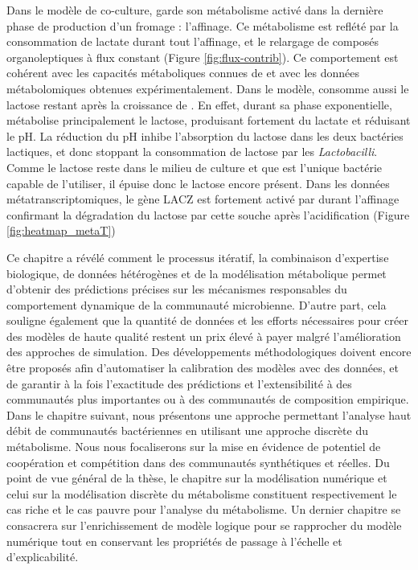Dans le modèle de co-culture, \freud garde son métabolisme activé  dans la dernière phase de production d'un fromage : l'affinage. Ce métabolisme est reflété par la consommation de lactate durant tout l'affinage, et le relargage de composés organoleptiques à flux constant (Figure \ref{fig:flux-contrib}). Ce comportement est cohérent avec les capacités métaboliques connues de \freud et avec les données métabolomiques obtenues expérimentalement. Dans le modèle, \freud consomme aussi le lactose restant après la croissance de \lactis. En effet, durant sa phase exponentielle, \lactis métabolise principalement le lactose, produisant fortement du lactate et réduisant le pH. La réduction du pH inhibe l'absorption du lactose dans les deux bactéries lactiques, et donc stoppant la consommation de lactose par les \textit{Lactobacilli}. Comme le lactose reste dans le milieu de culture et que \freud est l'unique bactérie capable de l'utiliser, il épuise donc le lactose encore présent. Dans les données métatranscriptomiques, le gène LACZ est fortement activé par \freud durant l'affinage confirmant la dégradation du lactose par cette souche après l'acidification (Figure \ref{fig:heatmap_metaT}) 


Ce chapitre a révélé comment le processus itératif, la combinaison d'expertise biologique, de données hétérogènes et de la modélisation métabolique permet d'obtenir des prédictions précises sur les mécanismes responsables du comportement dynamique de la communauté microbienne. D'autre part, cela souligne également que la quantité de données et les efforts nécessaires pour créer des modèles de haute qualité restent un prix élevé à payer malgré l'amélioration des approches de simulation. Des développements méthodologiques doivent encore être proposés afin d'automatiser la calibration des modèles avec des données, et de garantir à la fois l'exactitude des prédictions et l'extensibilité à des 
communautés plus importantes ou à des communautés de composition empirique.\\


Dans le chapitre suivant, nous présentons une approche permettant l'analyse haut débit de communautés bactériennes en utilisant une approche discrète du métabolisme. Nous nous focaliserons sur la mise en évidence de potentiel de coopération et compétition dans des communautés synthétiques et réelles. Du point de vue général de la thèse, le chapitre sur la modélisation numérique et celui sur la modélisation discrète du métabolisme constituent respectivement le cas riche et le cas pauvre pour l'analyse du métabolisme. Un dernier chapitre se consacrera sur l'enrichissement de modèle logique pour se rapprocher du modèle numérique tout en conservant les propriétés de passage à l'échelle et d'explicabilité.
\newpage

